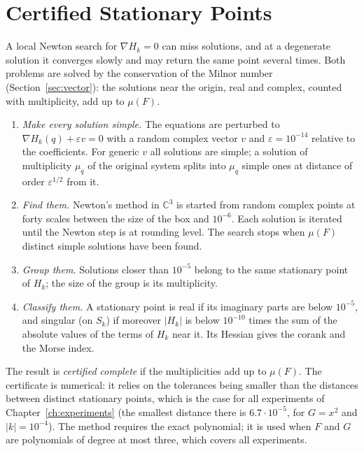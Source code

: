 \section{Certified Stationary Points}
\label{sec:method-stationary}

A local Newton search for $\nabla H_k=0$ can miss solutions, and at a
degenerate solution it converges slowly and may return the same point several
times. Both problems are solved by the conservation of the Milnor number
(Section~\ref{sec:vector}): the solutions near the origin, real and complex,
counted with multiplicity, add up to $\mu(F)$.

\begin{enumerate}
    \item \emph{Make every solution simple.} The equations are perturbed to
          $\nabla H_k(q)+\varepsilon v=0$ with a random complex vector $v$ and
          $\varepsilon=10^{-14}$ relative to the coefficients. For generic $v$
          all solutions are simple; a solution of multiplicity $\mu_q$ of the
          original system splits into $\mu_q$ simple ones at distance of order
          $\varepsilon^{1/2}$ from it.
    \item \emph{Find them.} Newton's method in $\mathbb{C}^3$ is started from
          random complex points at forty scales between the size of the box
          and $10^{-6}$. Each solution is iterated until the Newton step is at
          rounding level. The search stops when $\mu(F)$ distinct simple
          solutions have been found.
    \item \emph{Group them.} Solutions closer than $10^{-5}$ belong to the same
          stationary point of $H_k$; the size of the group is its multiplicity.
    \item \emph{Classify them.} A stationary point is real if its imaginary
          parts are below $10^{-5}$, and singular (on $S_k$) if moreover
          $|H_k|$ is below $10^{-10}$ times the sum of the absolute values of
          the terms of $H_k$ near it. Its Hessian gives the corank and the
          Morse index.
\end{enumerate}
The result is \emph{certified complete} if the multiplicities add up to
$\mu(F)$. The certificate is numerical: it relies on the tolerances being
smaller than the distances between distinct stationary points, which is the
case for all experiments of Chapter~\ref{ch:experiments} (the smallest
distance there is $6.7\cdot10^{-5}$, for $G=x^2$ and $|k|=10^{-4}$). The
method requires the exact polynomial; it is used when $F$ and $G$ are
polynomials of degree at most three, which covers all experiments.

